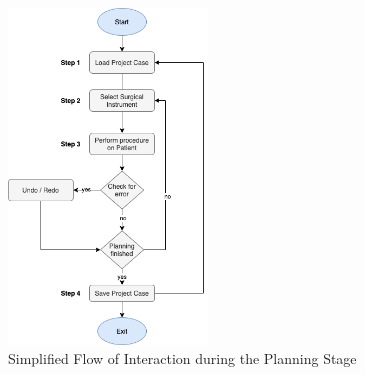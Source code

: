 \begin{figure}[ht]
    \centering
    \includegraphics[width=200px]{images/implementation/interaction_flow.png}
    \caption{\label{fig::InteractionFlow} Simplified Flow of Interaction during the Planning Stage}
\end{figure}

